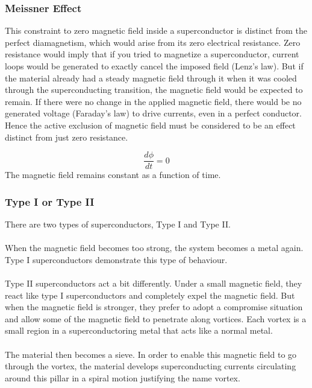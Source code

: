 \documentclass[10pt]{beamer}
\theoremstyle{definition}
\begin{document}
\begin{frame}
    \frametitle{Meissner Effect}

    This constraint to zero magnetic field inside a superconductor is 
    distinct from the perfect diamagnetism, which would arise from its 
    zero electrical resistance. Zero resistance would imply that if you 
    tried to magnetize a superconductor, current loops would be generated 
    to exactly cancel the imposed field (Lenz's law). But if the material 
    already had a steady magnetic field through it when it was cooled 
    through the superconducting transition, the magnetic field would be 
    expected to remain. If there were no change in the applied magnetic 
    field, there would be no generated voltage (Faraday's law) to drive 
    currents, even in a perfect conductor. Hence the active exclusion 
    of magnetic field must be considered to be an effect distinct from 
    just zero resistance.

    \begin{equation}
        \frac{d \phi}{dt} = 0
    \end{equation}
    The magnetic field remains constant as a function of time.

\end{frame}



\begin{frame}
    \frametitle{Type I or Type II}

    There are two types of superconductors, Type I and Type II.
    \\~\\

    When the magnetic field becomes too strong, the system becomes 
    a metal again. Type I superconductors demonstrate this type of behaviour.
    \\~\\

    Type II superconductors act a bit differently.
    Under a small magnetic field, they react like type I superconductors
    and completely expel the magnetic field. But when the magnetic field 
    is stronger, they prefer to adopt a compromise situation and allow 
    some of the magnetic field to penetrate along vortices. Each vortex is a
    small region in a superconductoring metal that acts like a normal metal.
    \\~\\

    The material then becomes a sieve. In order to enable this magnetic 
    field to go through the vortex, the material develops superconducting 
    currents circulating around this pillar in a spiral motion justifying 
    the name vortex.


\end{frame}
\end{document}

